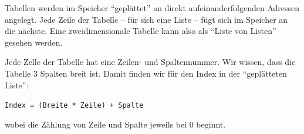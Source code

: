 \begin{tcolorbox}
\begin{center}
\end{center}
\end{tcolorbox}

Tabellen werden im Speicher \enquote{geplättet} an direkt aufeinanderfolgenden Adressen angelegt. Jede Zeile der Tabelle -- für sich eine Liste -- fügt sich im Speicher an die nächste. Eine zweidimensionale Tabelle kann also als \enquote{Liste von Listen} gesehen werden.

Jede Zelle der Tabelle hat eine Zeilen- und Spaltennummer. Wir wissen, dass die Tabelle 3 Spalten breit ist. Damit finden wir für den Index in der \enquote{geplätteten Liste}:
\begin{center}
\texttt{Index = (Breite * Zeile) + Spalte}
\end{center}
wobei die Zählung von Zeile und Spalte jeweils bei 0 beginnt.

